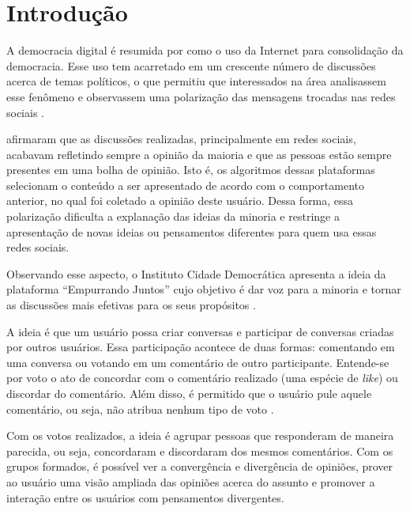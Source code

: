 \chapter[Introdução]{Introdução} \label{cap:introducao}

A democracia digital é resumida por  como o uso da Internet para consolidação da democracia.
Esse uso tem acarretado em um crescente número de discussões acerca de temas políticos, o que permitiu que interessados na área analisassem 
esse fenômeno e observassem uma polarização das mensagens trocadas nas redes sociais \cite{empurrandojuntos}.

 afirmaram que as discussões realizadas, principalmente em redes sociais, 
acabavam refletindo sempre a opinião da maioria e que as pessoas estão sempre presentes em uma bolha de opinião. 
Isto é, os algoritmos dessas plataformas selecionam o conteúdo a ser apresentado de acordo com o comportamento anterior,
no qual foi coletado a opinião deste usuário.
Dessa forma, essa polarização dificulta a explanação das ideias da minoria e restringe a apresentação de novas ideias ou pensamentos diferentes 
para quem usa essas redes sociais. 

Observando esse aspecto, o Instituto Cidade Democrática apresenta a ideia da plataforma ``Empurrando Juntos'' cujo objetivo 
é dar voz para a minoria e tornar as discussões mais efetivas para os seus propósitos \cite{empurrandojuntos}.

A ideia é que um usuário possa criar conversas e participar de conversas criadas por outros usuários. Essa participação 
acontece de duas formas: comentando em uma conversa ou votando em um comentário de outro participante. Entende-se por voto
o ato de concordar com o comentário realizado (uma espécie de \textit{like}) ou discordar do comentário. Além disso, é permitido
que o usuário pule aquele comentário, ou seja, não atribua nenhum tipo de voto \cite{empurrandojuntos}. 

Com os votos realizados, a ideia é agrupar pessoas que responderam de maneira parecida, ou seja, concordaram e
discordaram dos mesmos comentários. Com os grupos formados, é possível ver a convergência e divergência de opiniões, 
prover ao usuário uma visão ampliada das opiniões acerca do assunto e promover a interação entre os usuários com 
pensamentos divergentes.

